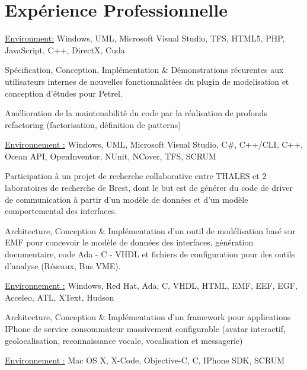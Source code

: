 \documentclass[10pt,letterpaper]{resume/resume}
\begin{document}
  \begin{minipage}[t]{\linewidth}
    \section{Exp\'erience Professionnelle}

\par 
\par\underline{Environment:} Windows, UML, Microsoft Visual Studio, TFS, HTML5, PHP, JavaScript, C++, DirectX, Cuda
\par Sp\'ecification, Conception, Impl\'ementation \& D\'emonstrations r\'ecurentes aux utilisateurs internes de nouvelles fonctionnalit\'ees du plugin de modelisation et conception d'\'etudes pour Petrel.
\par Am\'elioration de la maintenabilit\'e du code par la r\'ealisation de profonds refactoring (factorisation, d\'efinition de patterns)
\par\underline{Environnement :} Windows, UML, Microsoft Visual Studio, C\#, C++/CLI, C++, Ocean API, OpenInventor, NUnit, NCover, TFS, SCRUM

\par Participation à un projet de recherche collaborative entre THALES et 2 laboratoires de recherche de Brest, dont le but est de g\'en\'erer du code de driver de communication à partir d'un modèle de donn\'ees et d'un modèle comportemental des interfaces.
\par Architecture, Conception \& Impl\'ementation d'un outil de mod\'elisation bas\'e sur EMF pour concevoir le modèle de donn\'ees des interfaces, g\'en\'eration documentaire, code Ada - C - VHDL et fichiers de configuration pour des outils d'analyse (R\'eseaux, Bus VME).
\par\underline{Environnement :} Windows, Red Hat, Ada, C, VHDL, HTML, EMF, EEF, EGF, Acceleo, ATL, XText, Hudson

\par Architecture, Conception \& Impl\'ementation d'un framework pour applications IPhone de service consommateur massivement configurable (avatar interactif, geolocalisation, reconnaissance vocale, vocalisation et messagerie) 
\par\underline{Environnement :} Mac OS X, X-Code, Objective-C, C, IPhone SDK, SCRUM


\end{minipage}
\end{document}
